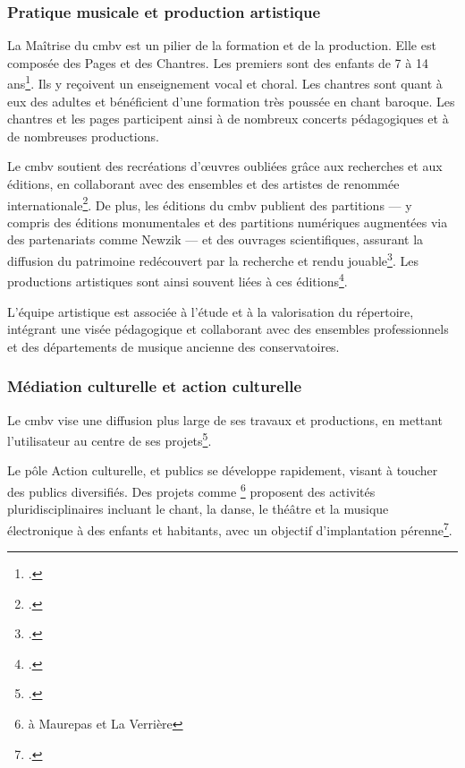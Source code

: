 \subsubsection{Pratique musicale et production artistique}

La Maîtrise du \gls{cmbv} est un pilier de la formation et de la production. Elle est composée des Pages et des Chantres. Les premiers sont des enfants de 7 à 14 ans\footcite{CentreMusiqueBaroquec}. Ils y reçoivent un enseignement vocal et choral. Les chantres sont quant à eux des adultes et bénéficient d'une formation très poussée en chant baroque. Les chantres et les pages participent ainsi à de nombreux concerts pédagogiques et à de nombreuses productions.

Le \gls{cmbv} soutient des recréations d'œuvres oubliées grâce aux recherches et aux éditions, en collaborant avec des ensembles et des artistes de renommée internationale\footcite{CentreMusiqueBaroque}. De plus, les éditions du \gls{cmbv} publient des partitions --- y compris des éditions monumentales et des partitions numériques augmentées via des partenariats comme Newzik --- et des ouvrages scientifiques, assurant la diffusion du patrimoine redécouvert par la recherche et rendu jouable\footcite{CentreMusiqueBaroque}. Les productions artistiques sont ainsi souvent liées à ces éditions\footcite{centredemusiquebaroquedeversaillesRapportActivite2023}.

L'équipe artistique est associée à l'étude et à la valorisation du répertoire, intégrant une visée pédagogique et collaborant avec des ensembles professionnels et des départements de musique ancienne des conservatoires.

\subsubsection{Médiation culturelle et action culturelle}

Le \gls{cmbv} vise une diffusion plus large de ses travaux et productions, en mettant l'utilisateur au centre de ses projets\footcite{centredemusiquebaroquedeversaillesProjetEtablissement2022}.

Le pôle Action culturelle,  et publics se développe rapidement, visant à toucher des publics diversifiés. Des projets comme \footnote{à Maurepas et La Verrière} proposent des activités pluridisciplinaires incluant le chant, la danse, le théâtre et la musique électronique à des enfants et habitants, avec un objectif d'implantation pérenne\footcite{centredemusiquebaroquedeversaillesProjetEtablissement2022}.

